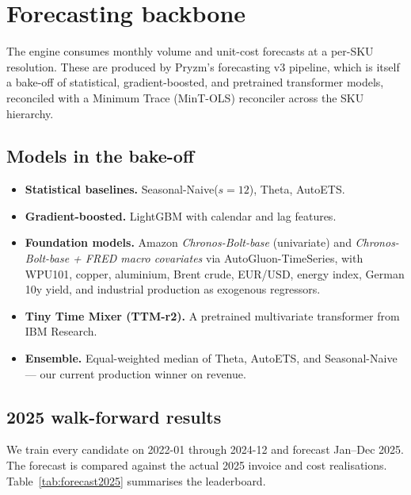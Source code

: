 \documentclass[11pt,a4paper]{article}
\begin{document}
\section{Forecasting backbone}
\label{sec:forecasting}

The engine consumes monthly volume and unit-cost forecasts at a per-SKU resolution. These are produced by Pryzm's forecasting v3 pipeline, which is itself a bake-off of statistical, gradient-boosted, and pretrained transformer models, reconciled with a Minimum Trace (MinT-OLS) reconciler across the SKU hierarchy.

\subsection{Models in the bake-off}
\begin{itemize}[leftmargin=2em,itemsep=2pt]
  \item \textbf{Statistical baselines.} Seasonal-Naive($s{=}12$), Theta, AutoETS.
  \item \textbf{Gradient-boosted.} LightGBM with calendar and lag features.
  \item \textbf{Foundation models.} Amazon \emph{Chronos-Bolt-base} (univariate) and \emph{Chronos-Bolt-base + FRED macro covariates} via AutoGluon-TimeSeries, with WPU101, copper, aluminium, Brent crude, EUR/USD, energy index, German 10y yield, and industrial production as exogenous regressors.
  \item \textbf{Tiny Time Mixer (TTM-r2).} A pretrained multivariate transformer from IBM Research.
  \item \textbf{Ensemble.} Equal-weighted median of Theta, AutoETS, and Seasonal-Naive --- our current production winner on revenue.
\end{itemize}

\subsection{2025 walk-forward results}
We train every candidate on 2022-01 through 2024-12 and forecast Jan--Dec 2025. The forecast is compared against the actual 2025 invoice and cost realisations. Table~\ref{tab:forecast2025} summarises the leaderboard.
\end{document}

